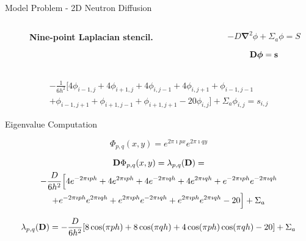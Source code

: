 \documentclass{beamer}
\begin{document}
\begin{frame}{Model Problem - 2D Neutron Diffusion}

  \begin{columns}

    \begin{column}{0.5\textwidth}
      \begin{figure}[t!]
        \begin{center}
          \scalebox{0.5}{}
        \end{center}
        \caption{\textbf{Nine-point Laplacian stencil.}}
      \end{figure}
    \end{column}

    \begin{column}{0.5\textwidth}
      \[
        -D \boldsymbol{\nabla}^2 \phi + \Sigma_a \phi = S
      \]

      \[
        \mathbf{D}\boldsymbol{\phi}=\mathbf{s}
      \]
    \end{column}

  \end{columns}

  \begin{multline}
    -\frac{1}{6h^2}[4 \phi_{i-1,j} + 4 \phi_{i+1,j} + 4 \phi_{i,j-1} + 4
      \phi_{i,j+1} + \phi_{i-1,j-1}\\ + \phi_{i-1,j+1} + \phi_{i+1,j-1}
      + \phi_{i+1,j+1} - 20 \phi_{i,j}] + \Sigma_a \phi_{i,j} = s_{i,j}
  \end{multline}

\end{frame}

\begin{frame}{Eigenvalue Computation}

\[
  \Phi_{p,q}(x,y) = e^{2 \pi \imath p x} e^{2 \pi \imath q y}
\]

\begin{multline}
  \mathbf{D}\Phi_{p,q}(x,y) = \lambda_{p,q}(\mathbf{D})
  =\\ -\frac{D}{6h^2}\Big[4 e^{-2 \pi \imath p h} + 4 e^{2 \pi \imath
      p h} + 4 e^{-2 \pi \imath q h} + 4 e^{2 \pi \imath q h} + e^{-2
      \pi \imath p h} e^{-2 \pi \imath q h} \\ + e^{-2 \pi \imath p h}
    e^{2 \pi \imath q h} + e^{2 \pi \imath p h} e^{-2 \pi \imath q h}
    + e^{2 \pi \imath p h} e^{2 \pi \imath q h} - 20\Big] + \Sigma_a
\end{multline}

\[
  \lambda_{p,q}(\mathbf{D}) = -\frac{D}{6h^2}[ 8 \cos(\pi p h) + 8
    \cos(\pi q h) + 4 \cos(\pi p h) \cos(\pi q h) - 20] + \Sigma_a
\]

\end{frame}
\end{document}
